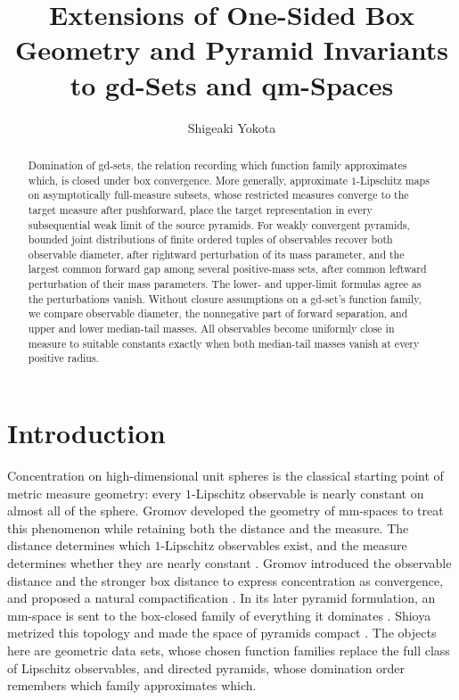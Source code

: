 \documentclass{amsart}
\title[One-Sided Box Geometry and Pyramid Invariants]{Extensions of One-Sided Box Geometry and Pyramid Invariants to gd-Sets and qm-Spaces}
\author{Shigeaki Yokota}
\date{}
\theoremstyle{plain}
\theoremstyle{definition}
\theoremstyle{remark}
\begin{document}
\begin{abstract}
Domination of gd-sets, the relation recording which function family
approximates which, is closed under box convergence.  More generally,
approximate $1$-Lipschitz maps on asymptotically full-measure subsets, whose
restricted measures converge to the target measure after pushforward, place
the target representation in every subsequential weak limit of the source
pyramids.  For weakly convergent pyramids, bounded joint distributions of
finite ordered tuples of observables recover both observable diameter, after
rightward perturbation of its mass parameter, and the largest common forward
gap among several positive-mass sets, after common leftward perturbation of
their mass parameters.  The lower- and upper-limit formulas agree as the
perturbations vanish.  Without closure assumptions on a gd-set's function
family, we compare observable diameter, the nonnegative part of forward
separation, and upper and lower median-tail masses.  All observables become
uniformly close in measure to suitable constants exactly when both median-tail
masses vanish at every positive radius.
\end{abstract}

\maketitle

\section{Introduction}
\label{sec:introduction}

Concentration on high-dimensional unit spheres is the classical starting point of metric measure geometry: every $1$-Lipschitz observable is nearly constant on almost all of the sphere.  Gromov developed the geometry of mm-spaces to treat this phenomenon while retaining both the distance and the measure.  The distance determines which $1$-Lipschitz observables exist, and the measure determines whether they are nearly constant \cite[Introduction]{shioya2016mmg}.  Gromov introduced the observable distance and the stronger box distance to express concentration as convergence, and proposed a natural compactification \cite[Introduction and Section~2.2]{esaki-kazukawa-mitsuishi2024cones}.  In its later pyramid formulation, an mm-space is sent to the box-closed family of everything it dominates \cite[Definition~2.24]{esaki-kazukawa-mitsuishi2024cones}.  Shioya metrized this topology and made the space of pyramids compact \cite[Definition~4.5 and Theorem~4.6]{shioya2022sugaku}.  The objects here are geometric data sets, whose chosen function families replace the full class of Lipschitz observables, and directed pyramids, whose domination order remembers which family approximates which.
\end{document}
